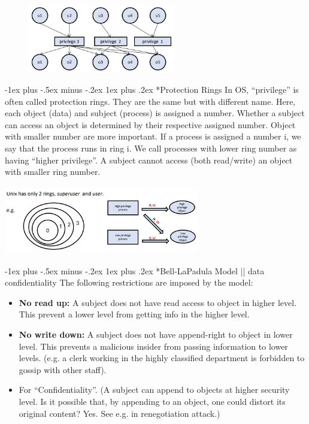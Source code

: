 \documentclass[10pt,landscape]{article}
\makeatletter
\renewcommand{\subsubsection}{\@startsection{subsubsection}{3}{0mm}%
                                {-1ex plus -.5ex minus -.2ex}%
                                {1ex plus .2ex}%
                                {\normalfont\small\bfseries}}
\makeatother
\begin{document}
\begin{multicols*}{3}
\includegraphics[width=8.5cm, height=3cm]{images/privilege.png}


\subsubsection*{Protection Rings}
In OS, “privilege” is often called protection rings. They are the same but
with different name. Here, each object (data) and subject (process) is
assigned a number. Whether a subject can access an object is determined
by their respective assigned number. Object with smaller number are more
important. If a process is assigned a number i, we say that the process runs
in ring i. We call processes with lower ring number as having “higher
privilege”. A subject cannot access (both read/write) an object with smaller ring
number. 

\includegraphics[width=8.5cm, height=3cm]{images/rings.png}

\subsubsection*{Bell-LaPadula Model || data confidentiality}
The following restrictions are imposed by the model:
\begin{itemize}[noitemsep,wide=0pt, leftmargin=\dimexpr{} + 2\relax]
    \item \textbf{No read up:} A subject does not have read access to object in higher level. This prevent a lower level from
    getting info in the higher level.
    \item \textbf{No write down:} A subject does not have append-right to object in lower level. This prevents a malicious
    insider from passing information to lower levels. (e.g. a clerk working in the highly classified department is
    forbidden to gossip with other staff).
    \item For “Confidentiality”. (A subject can append to objects at higher security level. Is it possible that, by appending to an object, one could distort its original content? Yes.
    See e.g. in renegotiation attack.)
\end{itemize} 


\end{multicols*}
\end{document}
